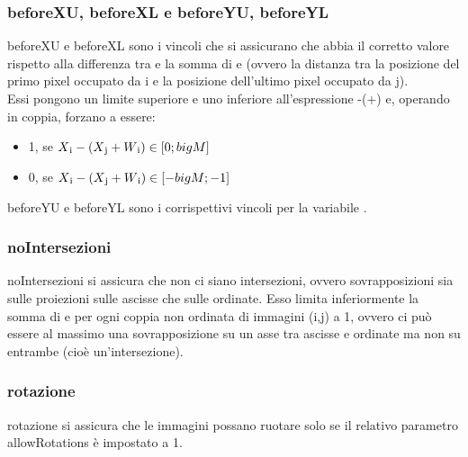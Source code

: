 
\newcommand{\Cij}{C\textsubscript{i,j}}

\subsubsection{beforeXU, beforeXL e beforeYU, beforeYL}
beforeXU e beforeXL sono i vincoli che si assicurano che \beforeXij{} abbia il corretto valore rispetto alla differenza tra \Xi{} e la somma di \Xj{} e \Wj{} (ovvero la distanza tra la posizione del primo pixel occupato da i e la posizione dell'ultimo pixel occupato da j). \\
Essi pongono un limite superiore e uno inferiore all'espressione \Xi{}-(\Xj{}+\Wj{}) e, operando in coppia, forzano \beforeXij{} a essere:
\begin{itemize}
	\itemsep0em
	\item 1, se $X\textsubscript{i}{}-(X\textsubscript{j}{}+W\textsubscript{i}{}) \in [0;bigM]$
	\item 0, se $X\textsubscript{i}{}-(X\textsubscript{j}{}+W\textsubscript{i}{}) \in [-bigM;-1]$
\end{itemize}
\iffalse
/*
Cx variabile d'aiuto per befX; dicono quanto spazio c'è a “sinistra” tra l'inizio di i e la fine di j
* >= 0 intersezione non possibile, 
* <0 intersezione possibile
Cy simile per befY
*/
\fi
beforeYU e beforeYL sono i corrispettivi vincoli per la variabile \beforeYij{}.


\subsubsection{noIntersezioni}
noIntersezioni si assicura che non ci siano intersezioni, ovvero sovrapposizioni sia sulle proiezioni sulle ascisse che sulle ordinate. Esso limita inferiormente la somma di \beforeXij{} e \beforeYij{} per ogni coppia non ordinata di immagini (i,j) a 1, ovvero ci può essere al massimo una sovrapposizione su un asse tra ascisse e ordinate ma non su entrambe (cioè un'intersezione).



\subsubsection{rotazione}
rotazione si assicura che le immagini possano ruotare solo se il relativo parametro allowRotations è impostato a 1.





